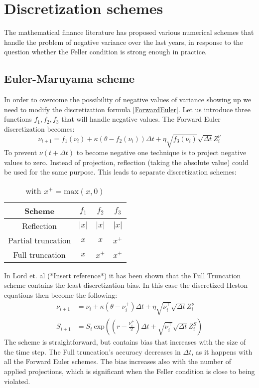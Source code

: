 \documentclass[12pt]{article}
\numberwithin{equation}{section}
\begin{document}
\section{Discretization schemes}
The mathematical finance literature has proposed various numerical schemes that handle the problem of negative variance over the last years, in response to the question whether the Feller condition is strong enough in practice.
\subsection{Euler-Maruyama scheme}
In order to overcome the possibility of negative values of variance showing up we need to modify the discretization formula \ref{ForwardEuler}. Let us introduce three functions $f_1, f_2, f_3$ that will handle negative values. The Forward Euler discretization becomes:
\begin{equation}\label{ForwardEulerFunctions}
\nu_{i+1} = f_1(\nu_{i}) + \kappa(\theta - f_2(\nu_{i}))\Delta t + \eta\sqrt{f_3(\nu_{i})}\sqrt{\Delta t}Z_i^\nu
\end{equation}
To prevent $\nu(t + \Delta t)$ to become negative one technique is to project negative values to zero. Instead of projection, reflection (taking the absolute value) could be used for the same purpose. This leads to separate discretization schemes:
\begin{table}[htb]
\centering
\begin{tabular}{|c|c|c|c|}
\hline
Scheme				&	$f_1$	&	$f_2$	&	$f_3$	\\
\hline
Reflection			&	$|x|$	&	$|x|$	&	$|x|$	\\
Partial truncation	&	$x$		&	$x$		&	$x^+$	\\
Full truncation		&	$x$		&	$x^+$	&	$x^+$	\\
\hline
\end{tabular}
\caption*{with $x^+ = \text{max}(x,0)$}
\end{table}
\newline
In Lord et. al (*Insert reference*) it has been shown that the Full Truncation scheme contains the least discretization bias. In this case the discretized Heston equations then become the following:
\begin{align}\label{FullTruncation}
		\nu_{i+1} &= \nu_{i} + \kappa(\theta - \nu_{i}^+)\Delta t + \eta\sqrt{\nu_{i}^+}\sqrt{\Delta t}Z_i^\nu \\
		\label{FullTruncation2}		
		S_{i+1} &= S_i \ \text{exp} \left ( \left (r - \frac{\nu_i^+}{2} \right  ) \Delta t + \sqrt{\nu_i^+} \sqrt{\Delta t} Z_i^S \right )
\end{align}
The scheme is straightforward, but contains bias that increases with the size of the time step. The Full truncation's accuracy decreases in $\Delta t$, as it happens with all the Forward Euler schemes. The bias increases also with the number of applied projections, which is significant when the Feller condition is close to being violated.
\end{document}
